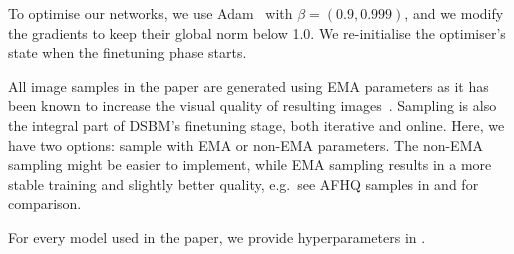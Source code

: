\documentclass{article}
\begin{document}
To optimise our networks, we use Adam~\citep{kingma:adam} with $\beta=(0.9, 0.999)$, and we modify the gradients to keep their global norm below 1.0. We re-initialise the optimiser's state when the finetuning phase starts. 

All image samples in the paper are generated using EMA parameters as it has been known to increase the visual quality of resulting images~\citep{song_improved_2020}. Sampling is also the integral part of DSBM's finetuning stage, both iterative and online. Here, we have two options: sample with EMA or non-EMA parameters. The non-EMA sampling might be easier to implement, while EMA sampling results in a more stable training and slightly better quality, e.g.~see AFHQ samples in  and  for comparison. 

For every model used in the paper, we provide hyperparameters in .

\begin{table}[htb]
\centering
{}
\vspace{1mm}
\caption{Hyper-parameters for each model. Note that for 2-networks models, the architectural hyper-parameters describe only one of the two identical networks. Approximate parameters counts are given for bidirectional networks, except for the Gaussian case, where we only experimented with a 2-networks model.}
\label{table:hypers}
\end{table}
\end{document}
